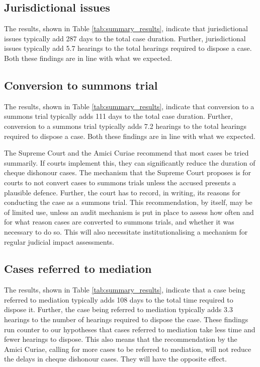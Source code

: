\subsection{Jurisdictional issues}
\label{sec:jurisd-issu}

The results, shown in Table \ref{tab:summary_results}, indicate that jurisdictional issues typically add 287 days to the total case duration. Further, jurisdictional issues typically add 5.7 hearings to the total hearings required to dispose a case. Both these findings are in line with what we expected.

\subsection{Conversion to summons trial}
\label{sec:conv -summ-trial-1}

The results, shown in Table \ref{tab:summary_results}, indicate that conversion to a summons trial typically adds 111 days to the total case duration. Further, conversion to a summons trial typically adds 7.2 hearings to the total hearings required to dispose a case. Both these findings are in line with what we expected.

The Supreme Court and the Amici Curiae recommend that most cases be tried summarily. If courts implement this, they can significantly reduce the duration of cheque dishonour cases. The mechanism that the Supreme Court proposes is for courts to not convert cases to summons trials unless the accused presents a plausible defence. Further, the court has to record, in writing, its reasons for conducting the case as a summons trial. This recommendation, by itself, may be of limited use, unless an audit mechanism is put in place to assess how often and for what reason cases are converted to summons trials, and whether it was necessary to do so. This will also necessitate institutionalising a mechanism for regular judicial impact assessments.

\subsection{Cases referred to mediation}
\label{sec:mediation}

The results, shown in Table \ref{tab:summary_results}, indicate that a case being referred to mediation typically adds 108 days to the total time required to dispose it. Further, the case being referred to mediation typically adds 3.3 hearings to the number of hearings required to dispose the case. These findings run counter to our hypotheses that cases referred to mediation take less time and fewer hearings to dispose. This also means that the recommendation by the Amici Curiae, calling for more cases to be referred to mediation, will not reduce the delays in cheque dishonour cases. They will have the opposite effect.

